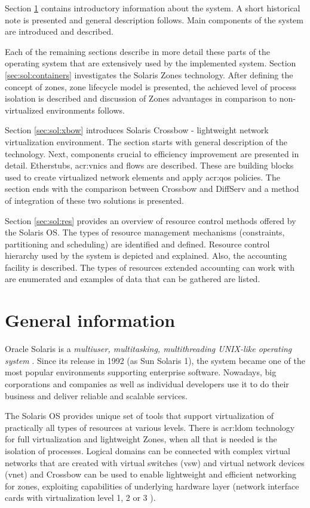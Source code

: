 \documentclass[11pt,openany]{book}
\begin{document}
    Section \ref{sec:sol:general} contains introductory information about the system. A short historical note is
    presented and general description follows. Main components of the system are introduced and described.
    
    Each of the remaining sections describe in more detail these parts of the operating system that are extensively used
    by the implemented system. Section \ref{sec:sol:containers} investigates the Solaris Zones technology. After
    defining the concept of zones, zone lifecycle model is presented, the achieved level of process isolation is
    described and discussion of Zones advantages in comparison to non-virtualized environments follows.

    Section \ref{sec:sol:xbow} introduces Solaris Crossbow - lightweight network virtualization environment. The section
    starts with general description of the technology. Next, components crucial to efficiency improvement are presented
    in detail. Etherstubs, \gls{acr:vnic}s and flows are described. These are building blocks used to create virtualized
    network elements and apply \gls{acr:qos} policies. The section ends with the comparison between Crossbow and
    DiffServ and a method of integration of these two solutions is presented.

    Section \ref{sec:sol:res} provides an overview of resource control methods offered by the Solaris OS. The types of
    resource management mechanisms (constraints, partitioning and scheduling) are identified and defined. Resource
    control hierarchy used by the system is depicted and explained. Also, the accounting facility is described. The
    types of resources extended accounting can work with are enumerated and examples of data that can be gathered are
    listed.


    \section{General information}
    \label{sec:sol:general}

      Oracle Solaris is a \textit{multiuser, multitasking, multithreading UNIX-like operating system} \cite{reference}.
      Since its release in 1992 (as Sun Solaris 1), the system became one of the most popular environments supporting
      enterprise software. Nowadays, big corporations and companies as well as individual developers use it to do their
      business and deliver reliable and scalable services.

      The Solaris OS provides unique set of tools that support virtualization of practically all types of resources at
      various levels. There is \gls{acr:ldom} technology for full virtualization and lightweight Zones, when all that is
      needed is the isolation of processes. Logical domains can be connected with complex virtual networks that are
      created with virtual switches (vsw) and virtual network devices (vnet) \cite{ldomag} and Crossbow can be used to
      enable lightweight and efficient networking for zones, exploiting capabilities of underlying hardware layer
      (network interface cards with virtualization level 1, 2 or 3 \cite{santos}).
\end{document}
